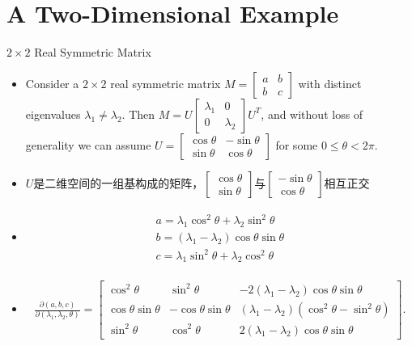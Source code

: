 \documentclass[UTF8,AutoFakeBold,AutoFakeSlant]{beamer}
\begin{document}
\section{A Two-Dimensional Example}

\begin{frame}{$2\times 2$ Real Symmetric Matrix}
    \begin{itemize}
        \scriptsize
        \item Consider a $2\times 2$ real symmetric matrix $M=\begin{bmatrix}a&b\\b&c\end{bmatrix}$ with distinct eigenvalues $\lambda_1\neq\lambda_2$. Then $M=U\begin{bmatrix}\lambda_1&0\\0&\lambda_2\end{bmatrix}U^T$, and without loss of generality we can assume $U=\begin{bmatrix} \cos\theta &-\sin\theta \\ \sin\theta & \cos\theta \end{bmatrix}$ for some $0\leq\theta<2\pi$.
        \item $U$是二维空间的一组基构成的矩阵，$\begin{bmatrix}\cos\theta \\ \sin\theta\end{bmatrix}$与$\begin{bmatrix}-\sin\theta \\ \cos\theta\end{bmatrix}$相互正交
        \item
              \begin{align*}
                  \begin{split}
                      a=\lambda_{1}\cos^{2}\theta+\lambda_{2}\sin^{2}\theta \\
                      b=(\lambda_1-\lambda_2)\cos\theta\sin\theta           \\
                      c=\lambda_{1}\sin^{2}\theta+\lambda_{2}\cos^{2}\theta
                  \end{split}
              \end{align*}
        \item
              \begin{align*}
                  \frac{\partial(a,b,c)}{\partial(\lambda_1,\lambda_2,\theta)}=\begin{bmatrix}\cos^2\theta&\sin^2\theta&-2(\lambda_1-\lambda_2)\cos\theta\sin\theta\\\cos\theta\sin\theta&-\cos\theta\sin\theta&(\lambda_1-\lambda_2)(\cos^2\theta-\sin^2\theta)\\\sin^2\theta&\cos^2\theta&2(\lambda_1-\lambda_2)\cos\theta\sin\theta\end{bmatrix}.
              \end{align*}
    \end{itemize}
\end{frame}
\end{document}
